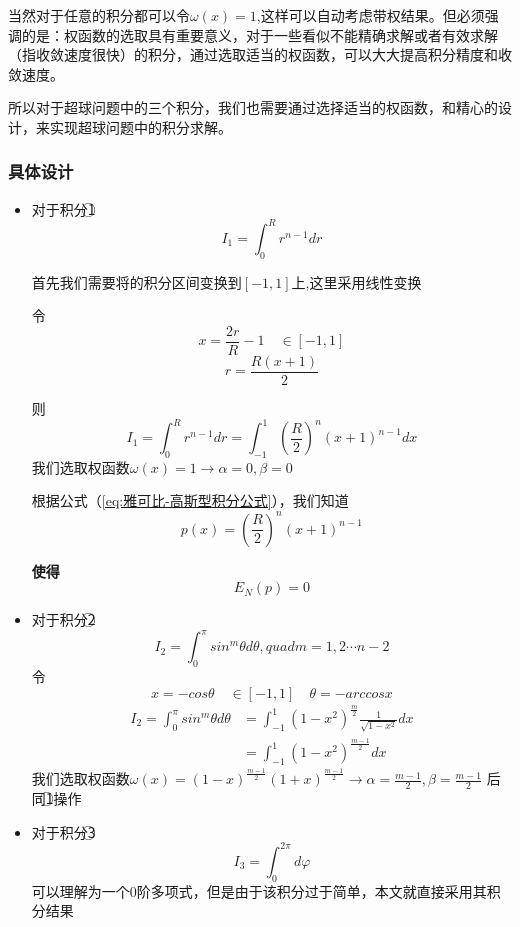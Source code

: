 \documentclass[12pt]{ctexart}
\numberwithin{equation}{section} %
\begin{document}
当然对于任意的积分都可以令$\omega(x)=1$,这样可以自动考虑带权结果。但必须强调的是：权函数的选取具有重要意义，对于一些看似不能精确求解或者有效求解（指收敛速度很快）的积分，通过选取适当的权函数，可以大大提高积分精度和收敛速度。

所以对于超球问题中的三个积分，我们也需要通过选择适当的权函数，和精心的设计，来实现超球问题中的积分求解。

\subsubsection{具体设计}
  \begin{itemize}
    \item 对于积分\textcircled{1}\begin{equation}
        I_1=\int^R_0 r^{n-1}dr
    \end{equation}
   
   首先我们需要将的积分区间变换到$[-1,1]$上,这里采用线性变换

   令\begin{equation}
        x=\frac{2r}{R}-1 \quad \in[-1,1]
    \end{equation}
    \begin{equation*}
        r=\frac{R(x+1)}{2}
    \end{equation*}

    则
    \begin{equation}
        I_1=\int^R_0r^{n-1}dr={\int_{-1}^{1}(\frac{R}{2})^n(x+1)^{n-1}dx}
    \end{equation}
    我们选取权函数$\omega(x)=1\rightarrow{\alpha=0,\beta=0}$
    
    根据公式（\ref{eq:雅可比-高斯型积分公式}），我们知道$$p(x)=(\frac{R}{2})^n(x+1)^{n-1}$$
    
    \textbf{使得$$E_N(p)=0$$}
\item 对于积分\textcircled{2}
   \begin{equation}
       I_2=\int ^\pi _0 sin^m \theta d\theta,quad m=1,2\cdots n-2
   \end{equation}
    令
    $$x=-cos\theta \quad \in [-1,1]\quad \theta=-arccosx$$
    \begin{equation}
        \begin{split}
       I_2= \int^\pi_0 sin^m \theta d\theta&=\int ^1_{-1}(1-x^2)^{\frac{m}{2}}\frac{1}{\sqrt{1-x^2}}dx\\
        &=\int ^1_{-1}(1-x^2)^{\frac{m-1}{2}}dx
    \end{split}
    \end{equation}
    我们选取权函数$\omega(x)=(1-x)^{\frac{m-1}{2}}(1+x)^{\frac{m-1}{2}}\rightarrow{\alpha=\frac{m-1}{2},\beta=\frac{m-1}{2}}$
    后同\textcircled{1}操作\\
   \item 对于积分\textcircled{3}
   $$I_3=\int^{2\pi}_0 d\varphi$$
   可以理解为一个$0$阶多项式，但是由于该积分过于简单，本文就直接采用其积分结果\\
\end{itemize}
    
\end{document}
